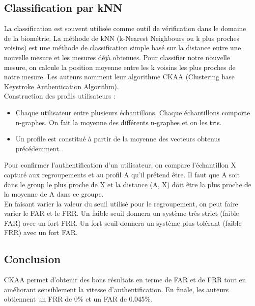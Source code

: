 \subsection{Classification par kNN}

La classification est souvent utilisée comme outil de vérification dans le domaine de la biométrie. La méthode de kNN (k-Nearest Neighbours ou k plus proches voisins) est une méthode de classification simple basé sur la distance entre une nouvelle mesure et les mesures déjà obtenues. Pour classifier notre nouvelle mesure, on calcule la position moyenne entre les k voisins les plus proches de notre mesure. Les auteurs nomment leur algorithme CKAA (Clustering base Keystroke Authentication Algorithm).\\

Construction des profils utilisateurs :\\

\begin{itemize}
  \item Chaque utilisateur entre plusieurs échantillons. Chaque échantillons comporte n-graphes. On fait la moyenne des différents n-graphes et on les tris.
  \item Un profile est constitué à partir de la moyenne des vecteurs obtenus précédemment.\\
\end{itemize}

Pour confirmer l'authentification d'un utilisateur, on compare l'échantillon X capturé aux regroupements et au profil A qu'il prétend être. Il faut que A soit dans le group le plus proche de X et la distance (A, X) doit être la plus proche de la moyenne de A dans ce groupe.\\

En faisant varier la valeur du seuil utilisé pour le regroupement, on peut faire varier le FAR et le FRR. Un faible seuil donnera un système très strict (faible FAR) avec un fort FRR. Un fort seuil donnera un système plus tolérant (faible FRR) avec un fort FAR.

\subsection{Conclusion}

CKAA permet d'obtenir des bons résultats en terme de FAR et de FRR tout en améliorant sensiblement la vitesse d'authentification. En finale, les auteurs obtiennent un FRR de 0\% et un FAR de 0.045\%.
